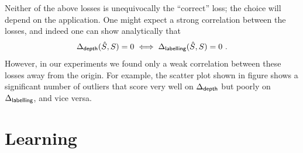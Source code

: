 Neither of the above losses is unequivocally the ``correct'' loss; the
choice will depend on the application. One might expect a strong
correlation between the losses, and indeed one can show analytically
that
\begin{equation}
  \Delta_{\textsf{depth}}(\hat{S},S) = 0
  \iff
  \Delta_{\textsf{labelling}}(\hat{S},S) = 0 ~.
\end{equation}
However, in our experiments we found only a weak correlation between
these losses away from the origin. For example, the scatter plot shown
in figure  shows a significant number of
outliers that score very well on $\Delta_{\textsf{depth}}$ but poorly on
$\Delta_{\textsf{labelling}}$, and vice versa.

\section{Learning}
\label{sec:learning}

